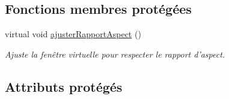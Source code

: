 \subsection*{Fonctions membres protégées}
\begin{DoxyCompactItemize}
\item 
virtual void \hyperlink{classvue_1_1_projection_a0a54db4b9c41f7386c6acde691a160ec}{ajuster\-Rapport\-Aspect} ()
\begin{DoxyCompactList}\small\item\em Ajuste la fenêtre virtuelle pour respecter le rapport d'aspect. \end{DoxyCompactList}\end{DoxyCompactItemize}
\subsection*{Attributs protégés}
